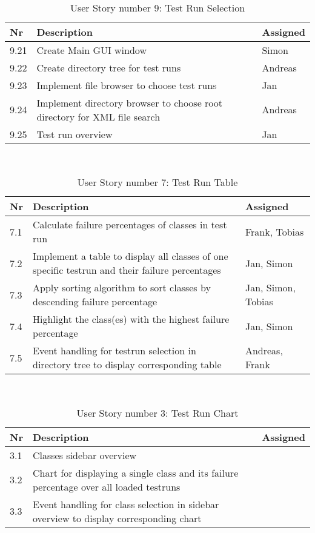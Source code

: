 \ \\

\begin{table}[h]
  \caption{User Story number 9: Test Run Selection}
  \label{US_Selection2}
  \centering
  \begin{tabular}{p{1cm}|p{5cm}|p{3cm}|}
  	Nr & Description & Assigned \\ 
  	\hline
  	9.21 & Create Main GUI window & Simon \\ 
  	\hline
  	9.22 & Create directory tree for test runs & Andreas \\ 
  	\hline
  	9.23 & Implement file browser to choose test runs & Jan \\
  	\hline
  	9.24 & Implement directory browser to choose root directory for XML file search & Andreas \\
  	\hline
  	9.25 & Test run overview & Jan \\ 
  	\hline
  \end{tabular}
\end{table} 

\ \\ 

\begin{table}[h]
  \caption{User Story number 7: Test Run Table}
  \label{US_Table}
  \centering
  \begin{tabular}{p{1cm}|p{5cm}|p{3cm}|}
  	Nr & Description & Assigned \\ 
  	\hline
  	7.1 & Calculate failure percentages of classes in test run & Frank, Tobias \\ 
  	\hline
  	7.2 & Implement a table to display all classes of one specific testrun and their failure percentages & Jan, Simon \\ 
  	\hline
  	7.3 & Apply sorting algorithm to sort classes by descending failure percentage & Jan, Simon, Tobias \\
  	\hline
  	7.4 & Highlight the class(es) with the highest failure percentage & Jan, Simon \\
  	\hline
  	7.5 & Event handling for testrun selection in directory tree to display corresponding table & Andreas, Frank \\ 
  	\hline
  \end{tabular}
\end{table} 

\ \\ 

\begin{table}[h]
  \caption{User Story number 3: Test Run Chart}
  \label{US_Chart}
  \centering
  \begin{tabular}{p{1cm}|p{5cm}|p{3cm}|}
  	Nr & Description & Assigned \\ 
  	\hline
  	3.1 & Classes sidebar overview &  \\ 
  	\hline
  	3.2 & Chart for displaying a single class and its failure percentage over all loaded testruns &  \\ 
  	\hline
  	3.3 & Event handling for class selection in sidebar overview to display corresponding chart &  \\
  	\hline
  \end{tabular}
\end{table} 

